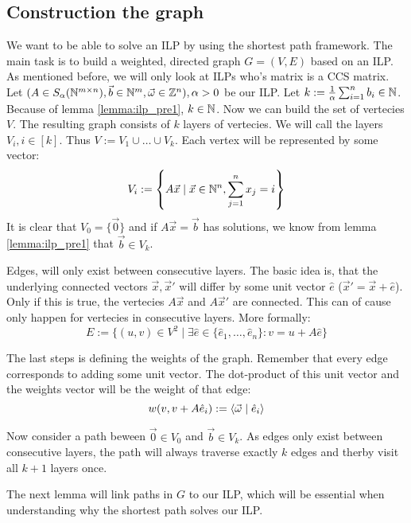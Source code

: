 \subsection{Construction the graph}
We want to be able to solve an ILP by using the shortest path framework. The main task is to build a weighted, directed graph $G = (V, E)$ based on an ILP. As mentioned before, we will only look at ILPs who's matrix is a CCS matrix. Let $(A \in S_\alpha(\mathbb{N}^{m \times n}), \vec b \in \mathbb{N}^m, \vec\omega \in \mathbb{Z}^n), \alpha > 0$ be our ILP. Let $k := \frac{1}{\alpha} \sum_{i=1}^{n}b_i \in \mathbb{N}$. Because of lemma \ref{lemma:ilp_pre1}, $k \in \mathbb{N}$. Now we can build the set of vertecies $V$. The resulting graph consists of $k$ layers of vertecies. We will call the layers $V_i, i \in [k]$. Thus $V := V_1 \cup \dots \cup V_k$. Each vertex will be represented by some vector:
$$V_i := \left\{A\vec x \mid \vec x \in \mathbb{N}^n, \sum_{j=1}^{n} x_j = i \right\}$$ 
It is clear that $V_0 = \{\vec 0\}$ and if $A\vec x = \vec b$ has solutions, we know from lemma \ref{lemma:ilp_pre1} that $\vec b \in V_k$. 

Edges, will only exist between consecutive layers. The basic idea is, that the underlying connected vectors $\vec x, \vec x'$ will differ by some unit vector $\hat e$ ($\vec x' = \vec x + \hat e$). Only if this is true, the vertecies $A\vec x$ and $A\vec x'$ are connected. This can of cause only happen for vertecies in consecutive layers. More formally: 
$$E := \{(u, v) \in V^2\mid \exists \hat e \in \{\hat e_1, \dots, \hat e_n\}\colon v = u + A\hat e\}$$

The last steps is defining the weights of the graph. Remember that every edge corresponds to adding some unit vector. The dot-product of this unit vector and the weights vector will be the weight of that edge:
$$w(v, v + A\hat e_i) := \langle \vec \omega \mid \hat e_i \rangle$$

Now consider a path beween $\vec 0\in V_0$ and $\vec b \in V_k$. As edges only exist between consecutive layers, the path will always traverse exactly $k$ edges and therby visit all $k+1$ layers once.

The next lemma will link paths in $G$ to our ILP, which will be essential when understanding why the shortest path solves our ILP.

